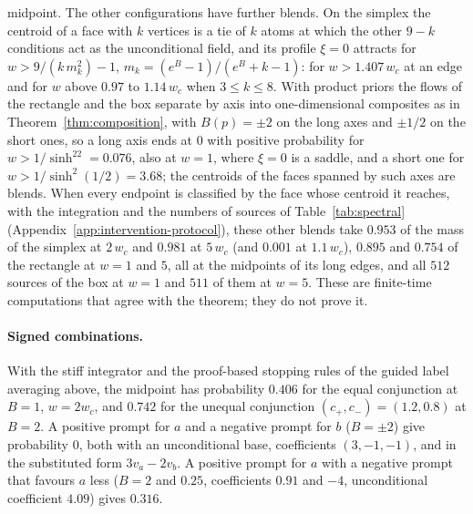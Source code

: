 \documentclass{article} %
\theoremstyle{plain}
\theoremstyle{definition}
\theoremstyle{remark}
\begin{document}
midpoint. The other configurations have further blends. On the simplex the centroid of a face with
$k$ vertices is a tie of $k$ atoms at which the other $9-k$ conditions act as the unconditional
field, and its profile $\xi=0$ attracts for $w>9/(k\,m_k^2)-1$, $m_k=(e^B-1)/(e^B+k-1)$: for
$w>1.407\,w_c$ at an edge and for $w$ above $0.97$ to $1.14\,w_c$ when $3\le k\le8$. With product
priors the flows of the rectangle and the box separate by axis into one-dimensional composites as
in Theorem~\ref{thm:composition}, with $B(p)=\pm2$ on the long axes and $\pm1/2$ on the short ones,
so a long axis ends at $0$ with positive probability for $w>1/\sinh^22=0.076$, also at $w=1$, where
$\xi=0$ is a saddle, and a short one for $w>1/\sinh^2(1/2)=3.68$; the centroids of the faces
spanned by such axes are blends. When every endpoint is classified by the face whose centroid it
reaches, with the integration and the numbers of sources of Table~\ref{tab:spectral}
(Appendix~\ref{app:intervention-protocol}), these other blends take $0.953$ of the mass of the
simplex at $2\,w_c$ and $0.981$ at $5\,w_c$ (and $0.001$ at $1.1\,w_c$), $0.895$ and $0.754$ of
the rectangle at $w=1$ and $5$, all at the midpoints of its long edges, and all $512$ sources of
the box at $w=1$ and $511$ of them at $w=5$. These are finite-time computations that agree with
the theorem; they do not prove it.

\paragraph{Signed combinations.} With the stiff integrator and the proof-based stopping
rules of the guided label averaging above, the midpoint has probability $0.406$ for the equal conjunction at
$B=1$, $w=2w_c$, and $0.742$ for the unequal conjunction $(c_+,c_-)=(1.2,0.8)$ at $B=2$. A positive
prompt for $a$ and a negative prompt for $b$ ($B=\pm2$) give probability $0$, both with an
unconditional base, coefficients $(3,-1,-1)$, and in the substituted form $3v_a-2v_b$. A positive
prompt for $a$ with a negative prompt that favours $a$ less ($B=2$ and $0.25$, coefficients $0.91$
and $-4$, unconditional coefficient $4.09$) gives $0.316$.
\end{document}
